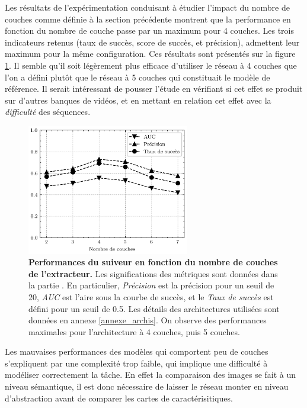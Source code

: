 \documentclass[10pt,twocolumn,letterpaper,french]{article}
\begin{document}
Les résultats de l'expérimentation conduisant à étudier l'impact du nombre de couches comme définie à la section précédente montrent que la performance en fonction du nombre de couche passe par un maximum pour 4 couches. Les trois indicateurs retenus (taux de succès, score de succès, et précision), admettent leur maximum pour la même configuration. Ces résultats sont présentés sur la figure \ref{courbes_fctlay_prec}. Il semble qu'il soit légèrement plus efficace d'utiliser le réseau à 4 couches que l'on a défini plutôt que le réseau à 5 couches qui constituait le modèle de référence. Il serait intéressant de pousser l'étude en vérifiant si cet effet se produit sur d'autres banques de vidéos, et en mettant en relation cet effet avec la \textit{difficulté} des séquences.

\begin{figure}[!h]
  \centering
  \includegraphics[width=200pt]{images/layers/courbes_fctlay_perfs.png} 
  \caption{\textbf{Performances du suiveur en fonction du nombre de couches de l'extracteur.} Les significations des métriques sont données dans la partie \textit{}. En particulier, \textit{Précision} est la précision pour un seuil de 20, \textit{AUC} est l'aire sous la courbe de succès, et le \textit{Taux de succès} est défini pour un seuil de 0.5. Les détails des architectures utilisées sont données en annexe \ref{annexe_archis}. On observe des performances maximales pour l'architecture à 4 couches, puis 5 couches.}
  \label{courbes_fctlay_prec}
  \end{figure}

Les mauvaises performances des modèles qui comportent peu de couches s'expliquent par une complexité trop faible, qui implique une difficulté à modéliser correctement la tâche. En effet la comparaison des images se fait à un niveau sémantique, il est donc nécessaire de laisser le réseau monter en niveau d'abstraction avant de comparer les cartes de caractérisitiques.
\end{document}
